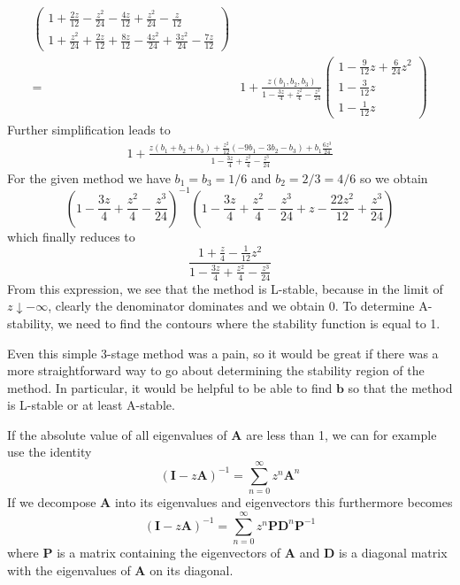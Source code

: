 \documentclass[10pt,a4paper]{article}
\newcommand{\bvec}[1]{\mathbf{#1}}
\begin{document}
\begin{align*}
\begin{pmatrix}
     1 + \frac{2z}{12} - \frac{z^2}{24} - \frac{4z}{12} + \frac{z^2}{24} - \frac{z}{12} \\
     1 + \frac{z^2}{24} + \frac{2z}{12} + \frac{8z}{12} - \frac{4z^2}{24} + \frac{3z^2}{24} - \frac{7z}{12}
   \end{pmatrix} \\
     =&
   1 + \frac{z (b_1, b_2, b_3)}{1 - \frac{3z}{4} + \frac{z^2}{4} - \frac{z^3}{24}}
   \begin{pmatrix}
     1 - \frac{9}{12} z + \frac{6}{24}z^2 \\
     1 - \frac{3}{12} z \\
     1 - \frac{1}{12} z
   \end{pmatrix}
\end{align*}
Further simplification leads to
\begin{align*}
  1 + \frac{z (b_1 + b_2 + b_3) + \frac{z^2}{12}\left(-9b_1 - 3b_2 - b_3\right) +  b_1\frac{6z^3}{24}}{1 - \frac{3z}{4} + \frac{z^2}{4} - \frac{z^3}{24}}
\end{align*}
For the given method we have $b_1 = b_3 = 1/6$ and $b_2 = 2/3 = 4/6$ so we obtain
\begin{equation*}
  \left(1 - \frac{3z}{4} + \frac{z^2}{4} - \frac{z^3}{24}\right)^{-1}\left(1 - \frac{3z}{4} + \frac{z^2}{4} - \frac{z^3}{24} + z - \frac{22 z^2}{12} + \frac{z^3}{24} \right)
\end{equation*}
which finally reduces to
\begin{equation*}
  \frac{1 + \frac{z}{4} - \frac{1}{12}z^2}{1 - \frac{3z}{4} + \frac{z^2}{4} - \frac{z^3}{24}}
\end{equation*}
From this expression, we see that the method is L-stable, because in the limit of $z\downarrow -\infty$, clearly the denominator dominates and we obtain 0.
To determine A-stability, we need to find the contours where the stability function is equal to 1.

Even this simple 3-stage method was a pain, so it would be great if there was a more straightforward way to go about determining the stability region of the method. In particular, it would be helpful to be able to find $\bvec{b}$ so that the method is L-stable or at least A-stable.

If the absolute value of all eigenvalues of $\bvec{A}$ are less than 1, we can for example use the identity
\begin{equation*}
  (\bvec{I}-z\bvec{A})^{-1} = \sum_{n=0}^{\infty} z^n \bvec{A}^n
\end{equation*}
If we decompose $\bvec{A}$ into its eigenvalues and eigenvectors this furthermore becomes
\begin{equation*}
  (\bvec{I}-z\bvec{A})^{-1} = \sum_{n=0}^{\infty} z^n \bvec{P}\bvec{D}^n \bvec{P}^{-1}
\end{equation*}
where $\bvec{P}$ is a matrix containing the eigenvectors of $\bvec{A}$ and $\bvec{D}$ is a diagonal matrix with the eigenvalues of $\bvec{A}$ on its diagonal.
\end{document}
